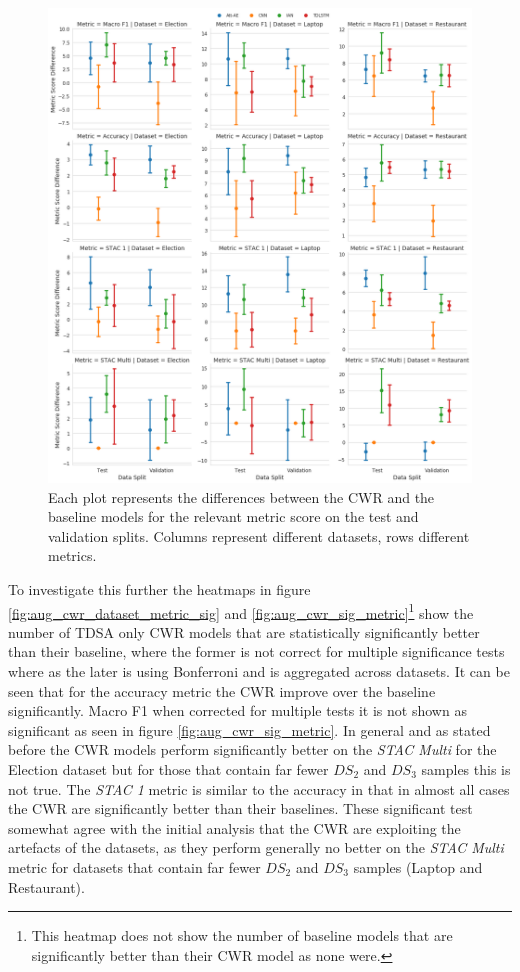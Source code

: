 \begin{figure}[!h]
    \centering
    \includegraphics[scale=0.3]{images/augmentation/methods_performance/CWR/overall_diff_cwr.png}
    \caption{Each plot represents the differences between the CWR and the baseline models for the relevant metric score on the test and validation splits. Columns represent different datasets, rows different metrics.}
    \label{fig:aug_overall_diff_cwr}
\end{figure}

To investigate this further the heatmaps in figure \ref{fig:aug_cwr_dataset_metric_sig} and \ref{fig:aug_cwr_sig_metric}\footnote{This heatmap does not show the number of baseline models that are significantly better than their CWR model as none were.} show the number of TDSA only CWR models that are statistically significantly better than their baseline, where the former is not correct for multiple significance tests where as the later is using Bonferroni and is aggregated across datasets. It can be seen that for the accuracy metric the CWR improve over the baseline significantly. Macro F1 when corrected for multiple tests it is not shown as significant as seen in figure \ref{fig:aug_cwr_sig_metric}. In general and as stated before the CWR models perform significantly better on the \textit{STAC Multi} for the Election dataset but for those that contain far fewer $DS_2$ and $DS_3$ samples this is not true. The \textit{STAC 1} metric is similar to the accuracy in that in almost all cases the CWR are significantly better than their baselines. These significant test somewhat agree with the initial analysis that the CWR are exploiting the artefacts of the datasets, as they perform generally no better on the \textit{STAC Multi} metric for datasets that contain far fewer $DS_2$ and $DS_3$ samples (Laptop and Restaurant).

